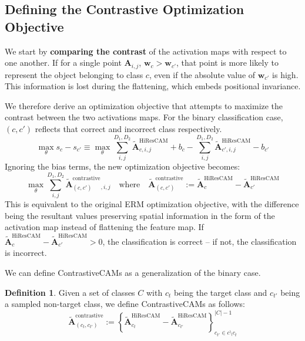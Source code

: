 \documentclass{article}
\theoremstyle{plain}
\theoremstyle{definition}
\newtheorem{definition}[theorem]{Definition}
\theoremstyle{remark}
\newcommand{\contcam}[2]{\tilde{\mathcal{\bm{A}}}^{\text{contrastive}}_{(#1, #2)}}
\begin{document}
\subsection{Defining the Contrastive Optimization Objective}
\label{sec:define-cont-cams}

We start by \textbf{comparing the contrast} of the activation maps with respect to one another. If for a single point $\bm{A}_{i,j}$, $\bm{w}_c > \bm{w}_{c'}$, that point is more likely to represent the object belonging to class $c$, even if the absolute value of $\bm{w}_{c'}$ is high. This information is lost during the flattening, which embeds positional invariance.

We therefore derive an optimization objective that attempts to maximize the contrast between the two activations maps. For the binary classification case, $(c, c')$ reflects that correct and incorrect class respectively.
\begin{equation}
	\max_{\theta} s_c - s_{c'} \equiv \max_{\theta} \sum^{D_1,D_2}_{i,j} \tilde{\mathcal{\bm{A}}}_{c,i,j}^{\text{HiResCAM}} + b_c - \sum^{D_1,D_2}_{i,j} \tilde{\mathcal{\bm{A}}}_{c',i,j}^{\text{HiResCAM}} - b_{c'}
\end{equation}
Ignoring the bias terms, the new optimization objective becomes:
\begin{equation}
	\max_{\theta} \sum^{D_1,D_2}_{i,j} \contcam{c}{c'}{}_{, i, j} \quad \text{where} \quad \contcam{c}{c'} := \tilde{\mathcal{\bm{A}}}_{c}^{\text{HiResCAM}} - \tilde{\mathcal{\bm{A}}}_{c'}^{\text{HiResCAM}}
\end{equation}
This is equivalent to the original ERM optimization objective, with the difference being the resultant values preserving spatial information in the form of the activation map instead of flattening the feature map. If $\tilde{\mathcal{\bm{A}}}_{c}^{\text{HiResCAM}} - \tilde{\mathcal{\bm{A}}}_{c'}^{\text{HiResCAM}} > 0$, the classification is correct -- if not, the classification is incorrect. 

We can define ContrastiveCAMs as a generalization of the binary case.

\begin{definition}
	Given a set of classes $C$ with $c_t$ being the target class and $c_{t'}$ being a sampled non-target class, we define ContrastiveCAMs as follows:
	\begin{equation}
		\contcam{c_t}{c_{t'}} := \left\{\tilde{\mathcal{\bm{A}}}_{c_t}^{\text{HiResCAM}} - \tilde{\mathcal{\bm{A}}}_{c_{t'}}^{\text{HiResCAM}}\right\}^{|C|-1}_{c_{t'} \in c \setminus c_t}
	\end{equation}
\end{definition}
\end{document}

